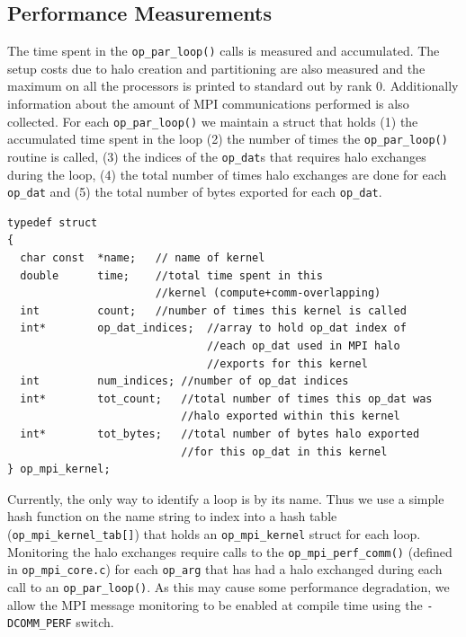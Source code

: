 \documentclass[11pt]{article}
\begin{document}
\subsection{Performance Measurements}\label{subsec/perf}
The time spent in the \texttt{op\_par\_loop()} calls is measured and accumulated. The setup costs due to halo creation
and partitioning are also measured and the maximum on all the processors is printed to standard out by rank 0.
Additionally information about the amount of MPI communications performed is also collected. For each
\texttt{op\_par\_loop()} we maintain a struct that holds (1) the accumulated time spent in the loop (2) the number of
times the \texttt{op\_par\_loop()} routine is called, (3) the indices of the \texttt{op\_dat}s that requires halo
exchanges during the loop, (4) the total number of times halo exchanges are done for each \texttt{op\_dat} and (5)
the total number of bytes exported for each \texttt{op\_dat}.
\begin{verbatim}
typedef struct
{
  char const  *name;   // name of kernel
  double      time;    //total time spent in this
                       //kernel (compute+comm-overlapping)
  int         count;   //number of times this kernel is called
  int*        op_dat_indices;  //array to hold op_dat index of
                               //each op_dat used in MPI halo
                               //exports for this kernel
  int         num_indices; //number of op_dat indices
  int*        tot_count;   //total number of times this op_dat was
                           //halo exported within this kernel
  int*        tot_bytes;   //total number of bytes halo exported
                           //for this op_dat in this kernel
} op_mpi_kernel;
\end{verbatim}
\noindent Currently, the only way to identify a loop is by its name. Thus we use a simple hash function on the
name string to index into a hash table (\texttt{op\_mpi\_kernel\_tab[]}) that holds an \texttt{op\_mpi\_kernel} struct
for each loop. Monitoring the halo exchanges require calls to the \texttt{op\_mpi\_perf\_comm()} (defined in
\texttt{op\_mpi\_core.c}) for each \texttt{op\_arg} that has had a halo exchanged during each call to an
\texttt{op\_par\_loop()}. As this may cause some performance degradation, we allow the MPI message monitoring to be
enabled at compile time using the \texttt{-DCOMM\_PERF} switch.



\end{document}
